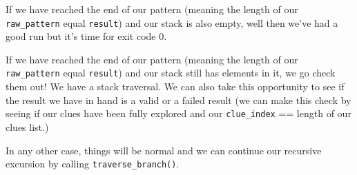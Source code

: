 If we have reached the end of our pattern (meaning the length of our \newline \texttt{raw\_pattern} equal \texttt{result}) and our stack is also empty, well then we've had a good run but it's time for exit code 0.

If we have reached the end of our pattern (meaning the length of our \newline \texttt{raw\_pattern} equal \texttt{result}) and our stack still has elements in it, we go check them out! We have a stack traversal. We can also take this opportunity to see if the result we have in hand is a valid or a failed result (we can make this check by seeing if our clues have been fully explored and our \texttt{clue\_index} == length of our clues list.)

In any other case, things will be normal and we can continue our recursive excursion by calling \texttt{traverse\_branch()}.